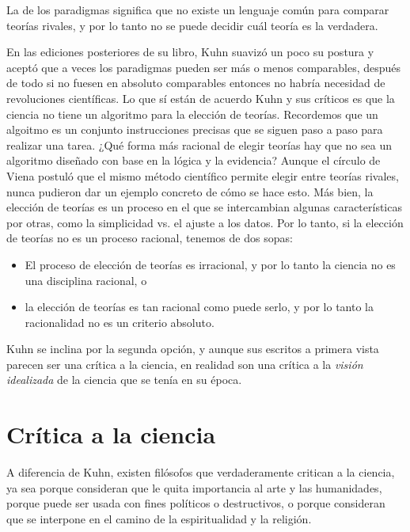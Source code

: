 \begin{remember}
    \label{rem:inconmensurabilidad}
    La  de los paradigmas significa que no
    existe un lenguaje común para comparar teorías rivales, y por lo tanto no
    se puede decidir cuál teoría es la verdadera.
\end{remember}

En las ediciones posteriores de su libro, Kuhn suavizó un poco su postura y
aceptó que a veces los paradigmas pueden ser más o menos comparables, después de
todo si no fuesen en absoluto comparables entonces no habría necesidad de
revoluciones científicas.
Lo que sí están de acuerdo Kuhn y sus críticos es que la ciencia no tiene un
algoritmo para la elección de teorías.
Recordemos que un algoitmo es un conjunto instrucciones precisas que se siguen
paso a paso para realizar una tarea.
¿Qué forma más racional de elegir teorías hay que no sea un algoritmo diseñado
con base en la lógica y la evidencia?
Aunque el círculo de Viena postuló que el mismo método científico permite
elegir entre teorías rivales, nunca pudieron dar un ejemplo concreto de cómo se
hace esto.
Más bien, la elección de teorías es un proceso en el que se intercambian algunas
características por otras, como la simplicidad vs. el ajuste a los datos.
Por lo tanto, si la elección de teorías no es un proceso racional, tenemos de
dos sopas:
\begin{itemize}
    \item El proceso de elección de teorías es irracional, y por lo tanto la
          ciencia no es una disciplina racional, o
    \item la elección de teorías es tan racional como puede serlo, y por lo
          tanto la racionalidad no es un criterio absoluto.
\end{itemize}
Kuhn se inclina por la segunda opción, y aunque sus escritos a primera vista
parecen ser una crítica a la ciencia, en realidad son una crítica a la
\emph{visión idealizada} de la ciencia que se tenía en su época.


\section{Crítica a la ciencia}
\label{sec:criticaalaciencia}
A diferencia de Kuhn, existen filósofos que verdaderamente critican a la
ciencia, ya sea porque consideran que le quita importancia al arte y las
humanidades, porque puede ser usada con fines políticos o destructivos, o porque
consideran que se interpone en el camino de la espiritualidad y la religión.

